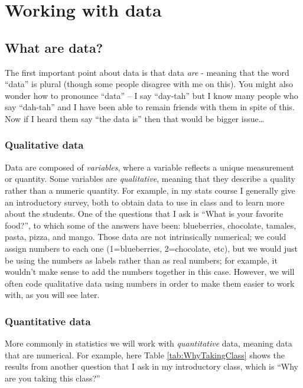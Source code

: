 \documentclass[]{book}
\theoremstyle{definition}
\theoremstyle{definition}
\theoremstyle{definition}
\theoremstyle{remark}
\begin{document}
\chapter{Working with data}\label{working-with-data}

\section{What are data?}\label{what-are-data}

The first important point about data is that data \emph{are} - meaning
that the word ``data'' is plural (though some people disagree with me on
this). You might also wonder how to pronounce ``data'' -- I say
``day-tah'' but I know many people who say ``dah-tah'' and I have been
able to remain friends with them in spite of this. Now if I heard them
say ``the data is'' then that would be bigger issue\ldots{}

\subsection{Qualitative data}\label{qualitative-data}

Data are composed of \emph{variables}, where a variable reflects a
unique measurement or quantity. Some variables are \emph{qualitative},
meaning that they describe a quality rather than a numeric quantity. For
example, in my stats course I generally give an introductory survey,
both to obtain data to use in class and to learn more about the
students. One of the questions that I ask is ``What is your favorite
food?'', to which some of the answers have been: blueberries, chocolate,
tamales, pasta, pizza, and mango. Those data are not intrinsically
numerical; we could assign numbers to each one (1=blueberries,
2=chocolate, etc), but we would just be using the numbers as labels
rather than as real numbers; for example, it wouldn't make sense to add
the numbers together in this case. However, we will often code
qualitative data using numbers in order to make them easier to work
with, as you will see later.

\subsection{Quantitative data}\label{quantitative-data}

More commonly in statistics we will work with \emph{quantitative} data,
meaning data that are numerical. For example, here Table
\ref{tab:WhyTakingClass} shows the results from another question that I
ask in my introductory class, which is ``Why are you taking this
class?''
\end{document}
